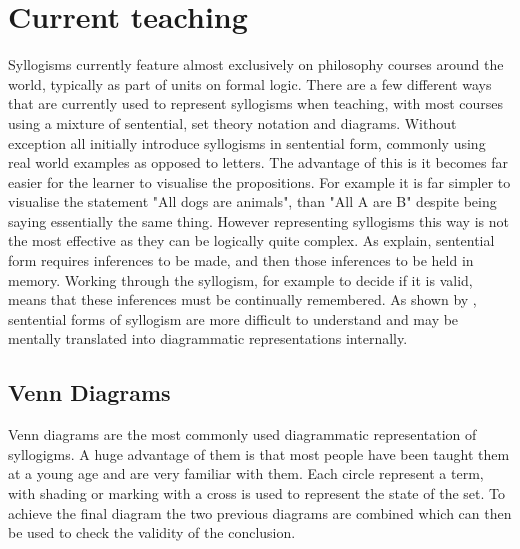 \documentclass[12pt,a4paper]{report}
\begin{document}
\section{Current teaching}
Syllogisms currently feature almost exclusively on philosophy courses around the world, typically as part of units on formal logic. 
There are a few different ways that are currently used to represent syllogisms when teaching, with most courses using a mixture of sentential, set theory notation and diagrams. 
Without exception all initially introduce syllogisms in sentential form, commonly using real world examples as opposed to letters. The advantage of this is it becomes far easier for the learner to visualise the propositions. For example it is far simpler to visualise the statement "All dogs are animals", than "All A are B" despite being saying essentially the same thing. 
However representing syllogisms this way is not the most effective as they can be logically quite complex. As \citep{larkin1987diagram} explain, sentential form requires inferences to be made, and then those inferences to be held in memory. Working through the syllogism, for example to decide if it is valid, means that these inferences must be continually remembered. As shown by \cite{johnson1980mental}, sentential forms of syllogism are more difficult to understand and may be mentally translated into diagrammatic representations internally. 

\subsection{Venn Diagrams}
Venn diagrams are the most commonly used diagrammatic representation of syllogigms. A huge advantage of them is that most people have been taught them at a young age and are very familiar with them. Each circle represent a term, with shading or marking with a cross is used to represent the state of the set. To achieve the final diagram the two previous diagrams are combined which can then  be used to check the validity of the conclusion.
\end{document}
